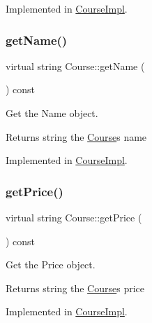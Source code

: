 Implemented in \hyperlink{classCourseImpl_adff450841bfdf955061e01088d67f948}{Course\+Impl}.

\mbox{\label{classCourse_aaf464936166f94c89b97671798996088}} 
\subsubsection{\texorpdfstring{get\+Name()}{getName()}}
{\footnotesize\ttfamily virtual string Course\+::get\+Name (\begin{DoxyParamCaption}{ }\end{DoxyParamCaption}) const\hspace{0.3cm}{\ttfamily [pure virtual]}}



Get the Name object. 

\begin{DoxyReturn}{Returns}
string the \hyperlink{classCourse}{Course}\textquotesingle{}s name 
\end{DoxyReturn}


Implemented in \hyperlink{classCourseImpl_ab1f1244e63d4d2938f1640d7ef308319}{Course\+Impl}.

\mbox{\label{classCourse_a7046438034cb468602eecf2c02013c00}} 
\subsubsection{\texorpdfstring{get\+Price()}{getPrice()}}
{\footnotesize\ttfamily virtual string Course\+::get\+Price (\begin{DoxyParamCaption}{ }\end{DoxyParamCaption}) const\hspace{0.3cm}{\ttfamily [pure virtual]}}



Get the Price object. 

\begin{DoxyReturn}{Returns}
string the \hyperlink{classCourse}{Course}\textquotesingle{}s price 
\end{DoxyReturn}


Implemented in \hyperlink{classCourseImpl_a0b7ff83c24bd1d8e7a6d10b6b89883cd}{Course\+Impl}.

\mbox{\label{classCourse_a460bb6c7b1acb7ecf6a702a3e890e32e}} 
